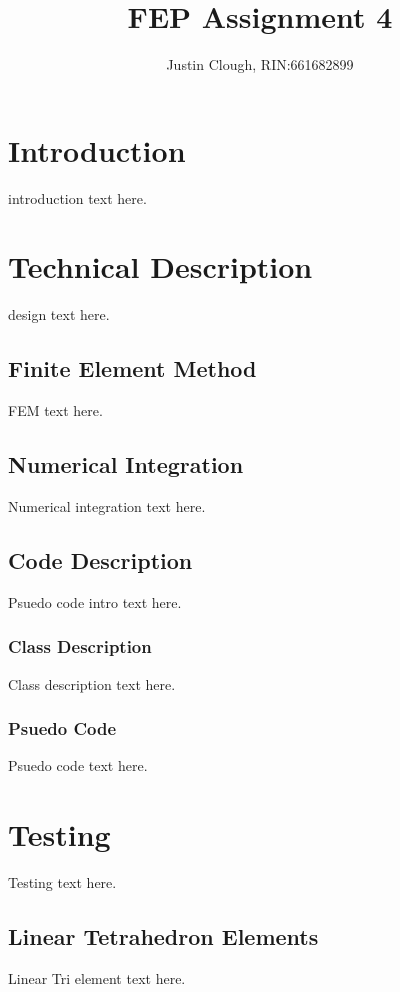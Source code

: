 \documentclass[a4paper, 12pt]{article}
\author{Justin Clough, RIN:661682899}
\title{FEP Assignment 4}
\begin{document}
\maketitle

\newpage
\section{Introduction} \label{sec:intro}
introduction text here.

\section{Technical Description} \label{sec:techDes}
design text here.

\subsection{Finite Element Method} \label{subsec:fem}
FEM text here.

\subsection{Numerical Integration} \label{subsec:numInt}
Numerical integration text here.

\subsection{Code Description} \label{subsec:codeDes}
Psuedo code intro text here.

\subsubsection{Class Description} \label{ssubsec:class}
Class description text here.

\subsubsection{Psuedo Code} \label{ssubsec:psuedo}
Psuedo code text here.

\section{Testing} \label{sec:testing}
Testing text here.

\subsection{Linear Tetrahedron Elements} \label{subsec:linTet}
Linear Tri element text here.
\end{document}
